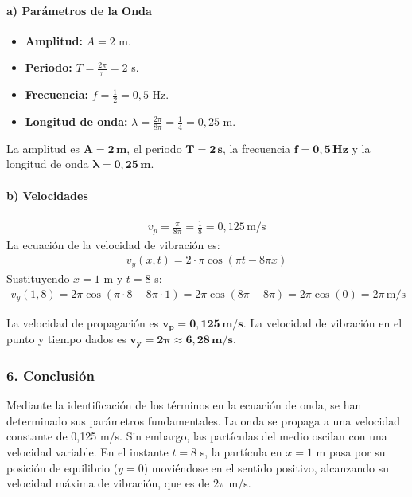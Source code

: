 \paragraph*{a) Parámetros de la Onda}
\begin{itemize}
    \item \textbf{Amplitud:} $A = 2$ m.
    \item \textbf{Periodo:} $T = \frac{2\pi}{\pi} = 2$ s.
    \item \textbf{Frecuencia:} $f = \frac{1}{2} = 0,5$ Hz.
    \item \textbf{Longitud de onda:} $\lambda = \frac{2\pi}{8\pi} = \frac{1}{4} = 0,25$ m.
\end{itemize}
\begin{cajaresultado}
La amplitud es $\boldsymbol{A=2\,m}$, el periodo $\boldsymbol{T=2\,s}$, la frecuencia $\boldsymbol{f=0,5\,Hz}$ y la longitud de onda $\boldsymbol{\lambda=0,25\,m}$.
\end{cajaresultado}
\paragraph*{b) Velocidades}
\begin{gather}
    v_p = \frac{\pi}{8\pi} = \frac{1}{8} = 0,125 \, \text{m/s}
\end{gather}
La ecuación de la velocidad de vibración es:
\begin{gather}
    v_y(x,t) = 2 \cdot \pi \cos(\pi t - 8\pi x)
\end{gather}
Sustituyendo $x=1$ m y $t=8$ s:
\begin{gather}
    v_y(1, 8) = 2\pi \cos(\pi \cdot 8 - 8\pi \cdot 1) = 2\pi \cos(8\pi - 8\pi) = 2\pi \cos(0) = 2\pi \, \text{m/s}
\end{gather}
\begin{cajaresultado}
La velocidad de propagación es $\boldsymbol{v_p = 0,125 \, m/s}$. La velocidad de vibración en el punto y tiempo dados es $\boldsymbol{v_y = 2\pi \approx 6,28 \, m/s}$.
\end{cajaresultado}

\subsubsection*{6. Conclusión}
\begin{cajaconclusion}
Mediante la identificación de los términos en la ecuación de onda, se han determinado sus parámetros fundamentales. La onda se propaga a una velocidad constante de 0,125 m/s. Sin embargo, las partículas del medio oscilan con una velocidad variable. En el instante $t=8$ s, la partícula en $x=1$ m pasa por su posición de equilibrio ($y=0$) moviéndose en el sentido positivo, alcanzando su velocidad máxima de vibración, que es de $2\pi$ m/s.
\end{cajaconclusion}

